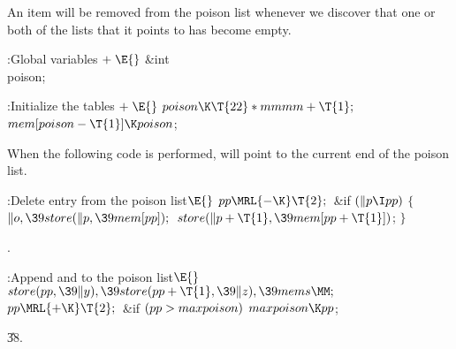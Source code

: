 An item will be removed from the poison list whenever we discover that one
or both of the lists that it points to has become empty.

\Y\B\4:Global variables\X${}\mathrel+\E{}$\6
\&{int} \\{poison};\par
\fi

\B{}:Initialize the tables\X${}\mathrel+\E{}$\6
$\\{poison}\K\T{22}*\\{mmmm}+\T{1};{}$\6
${}\\{mem}[\\{poison}-\T{1}]\K\\{poison}{}$;\par
\fi

When the following code is performed, 
will point to the
current end of the poison list.

\Y\B\4:Delete entry  from the poison list\X${}\E{}$\6
$\\{pp}\MRL{-{\K}}\T{2};{}$\6
\&{if} ${}(\|p\I\\{pp}){}$\5
${}\{{}$\1\6
${}\|o,\39\\{store}(\|p,\39\\{mem}[\\{pp}]);{}$\6
${}\\{store}(\|p+\T{1},\39\\{mem}[\\{pp}+\T{1}]){}$;\6
\4${}\}{}$\2\par
{}.\fi

\B{}:Append  and  to the poison
list\X${}\E{}$\6
$\\{store}(\\{pp},\39\|y),\39\\{store}(\\{pp}+\T{1},\39\|z),\39\\{mems}\MM;{}$\6
${}\\{pp}\MRL{+{\K}}\T{2};{}$\6
\&{if} ${}(\\{pp}>\\{maxpoison}){}$\1\5
${}\\{maxpoison}\K\\{pp}{}$;\2\par
\U38.\fi

